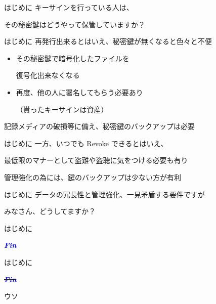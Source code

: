 \begin{frame}{はじめに}{}
  キーサインを行っている人は、
  \vspace{1cm}

  その秘密鍵はどうやって保管していますか？
\end{frame}

\begin{frame}{はじめに}{}
  再発行出来るとはいえ、秘密鍵が無くなると色々と不便
  \vspace{1cm}

  \begin{itemize}
  \item その秘密鍵で暗号化したファイルを

    復号化出来なくなる
  \item 再度、他の人に署名してもらう必要あり

    （貰ったキーサインは資産）
  \end{itemize}
  \vspace{1cm}

  記録メディアの破損等に備え、秘密鍵のバックアップは必要
\end{frame}

\begin{frame}{はじめに}{}
  一方、いつでも Revoke できるとはいえ、
  \vspace{1cm}

  最低限のマナーとして盗難や盗聴に気をつける必要も有り
  \vspace{1cm}

  管理強化の為には、鍵のバックアップは少ない方が有利
\end{frame}

\begin{frame}{はじめに}{}
  データの冗長性と管理強化、一見矛盾する要件ですが
  \vspace{1cm}

  みなさん、どうしてますか？
\end{frame}

\begin{frame}{はじめに}{}
  \begin{center}
    \textcolor{blue}{\LARGE {\bf {\it Fin}}}
  \end{center}
\end{frame}

\begin{frame}{はじめに}{}
  \begin{center}
    \sout{\textcolor{blue}{\LARGE {\bf {\it Fin}}}}

    {\LARGE ウソ}
  \end{center}
\end{frame}


